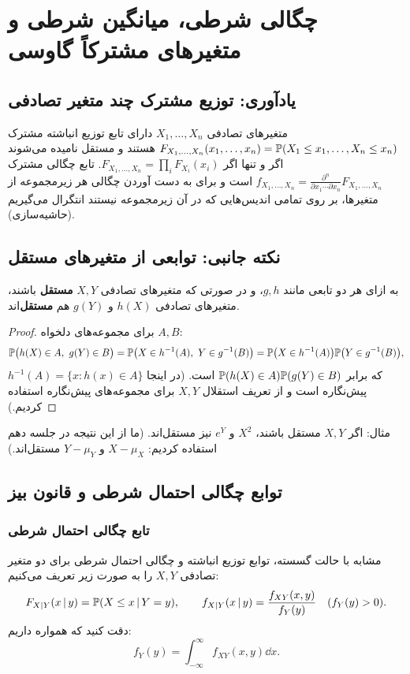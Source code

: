 \chapter{چگالی شرطی، میانگین شرطی و متغیرهای مشترکاً گاوسی}

\section{یادآوری: توزیع مشترک چند متغیر تصادفی}

متغیرهای تصادفی $X_1,\ldots,X_n$ دارای تابع توزیع انباشته مشترک
$F_{X_1,\ldots,X_n}(x_1,\ldots,x_n)=\mathbb{P}(X_1\le x_1,\ldots,X_n\le x_n)$
هستند و مستقل نامیده می‌شوند اگر و تنها اگر $F_{X_1,\ldots,X_n}=\prod_iF_{X_i}(x_i)$. تابع چگالی مشترک
$f_{X_1,\ldots,X_n}=\frac{\partial^n}{\partial x_1\cdots\partial x_n}F_{X_1,\ldots,X_n}$
است و برای به دست آوردن چگالی هر زیرمجموعه از متغیرها، بر روی تمامی اندیس‌هایی که در آن زیرمجموعه نیستند انتگرال می‌گیریم (حاشیه‌سازی).

\section{نکته جانبی: توابعی از متغیرهای مستقل}

\begin{theorem}
به ازای هر دو تابعی مانند $g,h$، و در صورتی که متغیرهای تصادفی $X,Y$ \textbf{مستقل} باشند، متغیرهای تصادفی $h(X)$ و $g(Y)$ هم \textbf{مستقل}‌اند.
\end{theorem}
\begin{proof}
برای مجموعه‌های دلخواه $A,B$:
\[
\mathbb{P}\big(h(X)\in A,\ g(Y)\in B\big)=\mathbb{P}\big(X\in h^{-1}(A),\ Y\in g^{-1}(B)\big)=\mathbb{P}\big(X\in h^{-1}(A)\big)\mathbb{P}\big(Y\in g^{-1}(B)\big),
\]
که برابر $\mathbb{P}(h(X)\in A)\mathbb{P}(g(Y)\in B)$ است. (در اینجا $h^{-1}(A)=\{x:h(x)\in A\}$ پیش‌نگاره است و از تعریف استقلال $X,Y$ برای مجموعه‌های پیش‌نگاره استفاده کردیم.)
\end{proof}
مثال: اگر $X,Y$ مستقل باشند، $X^2$ و $e^Y$ نیز مستقل‌اند. (ما از این نتیجه در جلسه دهم استفاده کردیم: $X-\mu_X$ و $Y-\mu_Y$ مستقل‌اند.)

\section{توابع چگالی احتمال شرطی و قانون بیز }

\subsection{تابع چگالی احتمال شرطی}
\begin{definition}
مشابه با حالت گسسته، توابع توزیع انباشته و چگالی احتمال شرطی برای دو متغیر تصادفی $X,Y$ را به صورت زیر تعریف می‌کنیم:
\[
F_{X|Y}(x\,|\, y)=\mathbb{P}(X\le x\,|\, Y=y),\qquad
f_{X|Y}(x\,|\, y)=\frac{f_{XY}(x,y)}{f_Y(y)}\quad(f_Y(y)>0).
\]
دقت کنید که همواره داریم:
\[
f_Y(y)=\int_{-\infty}^{\infty}f_{XY}(x,y)\dd x .
\]
\end{definition}

